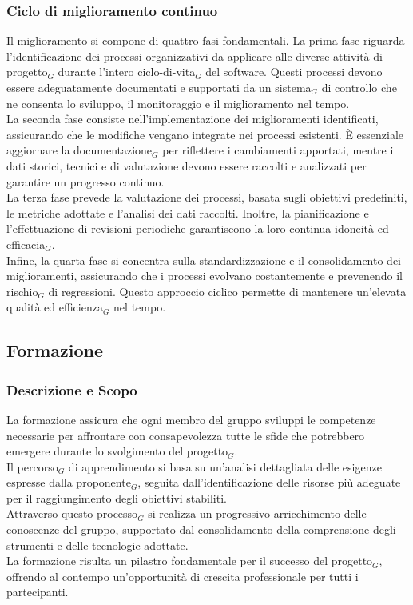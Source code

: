 \documentclass[10pt]{article}
\begin{document}
\begin{justify}
    \subsubsection{Ciclo di miglioramento continuo}
    Il miglioramento si compone di quattro fasi fondamentali. La prima fase riguarda l'identificazione dei processi organizzativi da applicare alle diverse attività di progetto$_G$ durante l'intero ciclo-di-vita$_G$ del software. Questi processi devono essere adeguatamente documentati e supportati da un sistema$_G$ di controllo che ne consenta lo sviluppo, il monitoraggio e il miglioramento nel tempo.\\
    La seconda fase consiste nell'implementazione dei miglioramenti identificati, assicurando che le modifiche vengano integrate nei processi esistenti. È essenziale aggiornare la documentazione$_G$ per riflettere i cambiamenti apportati, mentre i dati storici, tecnici e di valutazione devono essere raccolti e analizzati per garantire un progresso continuo.\\
    La terza fase prevede la valutazione dei processi, basata sugli obiettivi predefiniti, le metriche adottate e l'analisi dei dati raccolti. Inoltre, la pianificazione e l'effettuazione di revisioni periodiche garantiscono la loro continua idoneità ed efficacia$_G$.\\
    Infine, la quarta fase si concentra sulla standardizzazione e il consolidamento dei miglioramenti, assicurando che i processi evolvano costantemente e prevenendo il rischio$_G$ di regressioni. Questo approccio ciclico permette di mantenere un'elevata qualità ed efficienza$_G$ nel tempo.

    \subsection{Formazione}
    \label{formazione}
    \subsubsection{Descrizione e Scopo}
    La formazione assicura che ogni membro del gruppo sviluppi le competenze necessarie per affrontare con consapevolezza tutte le sfide che potrebbero emergere durante lo svolgimento del progetto$_G$.\\
    Il percorso$_G$ di apprendimento si basa su un'analisi dettagliata delle esigenze espresse dalla proponente$_G$, seguita dall'identificazione delle risorse più adeguate per il raggiungimento degli obiettivi stabiliti.\\
    Attraverso questo processo$_G$ si realizza un progressivo arricchimento delle conoscenze del gruppo, supportato dal consolidamento della comprensione degli strumenti e delle tecnologie adottate.\\
    La formazione risulta un pilastro fondamentale per il successo del progetto$_G$, offrendo al contempo un'opportunità di crescita professionale per tutti i partecipanti.


\end{justify}
\end{document}
